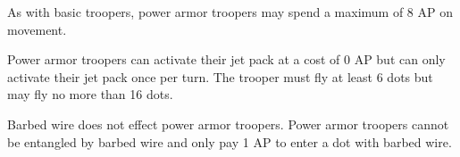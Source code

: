 As with basic troopers, power armor troopers may spend a maximum of 8 AP on movement.

Power armor troopers can activate their jet pack at a cost of 0 AP but can only activate their jet pack once per turn.
The trooper must fly at least 6 dots but may fly no more than 16 dots.

Barbed wire does not effect power armor troopers.
Power armor troopers cannot be entangled by barbed wire and only pay 1 AP to enter a dot with barbed wire.
